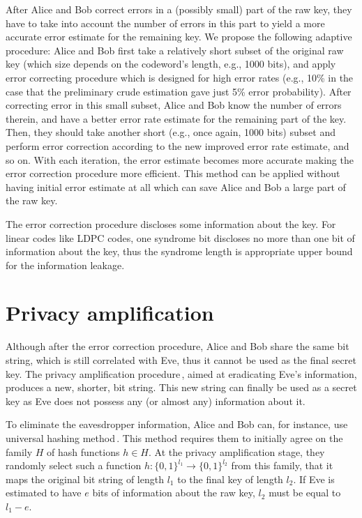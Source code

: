 \documentclass[a4paper]{article}
\begin{document}
After Alice and Bob correct errors in a (possibly small) part of the raw key, they have to take into account the number of errors in this part to yield a more accurate error estimate for the remaining key.
We propose the following adaptive procedure: Alice and Bob first take a relatively short subset of the original raw key (which size depends on the codeword's length, e.g., 1000 bits), and apply error correcting procedure which is designed for high error rates (e.g., 10\% in the case that the preliminary crude estimation gave just 5\% error probability). 
After correcting error in this small subset, Alice and Bob know the number of errors therein, and have a better error rate estimate for the remaining part of the key.
Then, they should take another short (e.g., once again, 1000 bits) subset and perform error correction according to the new improved error rate estimate, and so on. 
With each iteration, the error estimate becomes more accurate making the error correction procedure more efficient. 
This method can be applied without having initial error estimate at all which can save Alice and Bob a large part of the raw key.

The error correction procedure discloses some information about the key. For linear codes like LDPC codes, one syndrome bit discloses no more than one bit of information about the key, thus the syndrome length is appropriate upper bound for the information leakage.

\section{Privacy amplification}

Although after the error correction procedure, Alice and Bob share the same bit string, which is still correlated with Eve, thus it cannot be used as the final secret key.
The privacy amplification procedure\,\cite{Bennett_PA, Bennett_PAgeneralized, Brassard_PA}, aimed at eradicating Eve's information, produces a new, shorter, bit string.
This new string can finally be used as a secret key as Eve does not possess any (or almost any) information about it.

To eliminate the eavesdropper information, Alice and Bob can, for instance, use universal hashing method\,\cite{Carter_universal_hashing}.
This method requires them to initially agree on the family $H$ of hash functions $h \in H$.
At the privacy amplification stage, they randomly select such a function $h:\{0,1\}^{l_1}\rightarrow \{0,1\}^{l_2}$ from this family, that it maps the original bit string of length $l_1$ to the final key of length $l_2$. 
If Eve is estimated to have $e$ bits of information about the raw key, $l_2$ must be equal to $l_1-e$.
\end{document}
